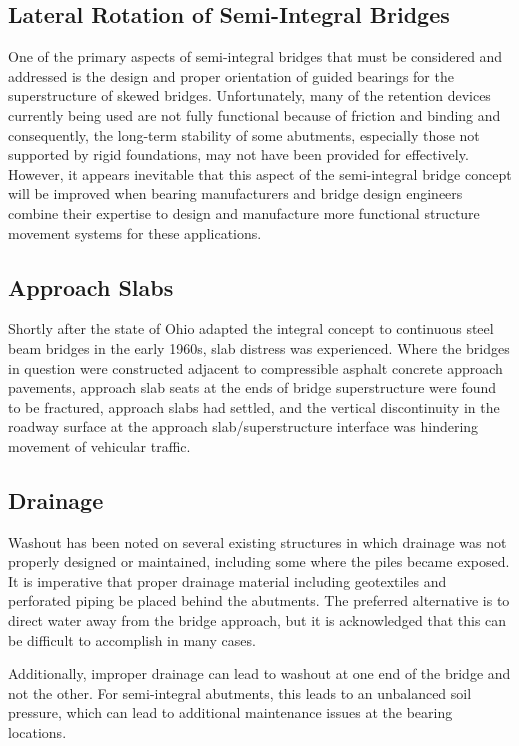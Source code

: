 \subsection{Lateral Rotation of Semi-Integral Bridges}
One of the primary aspects of semi-integral bridges that must be considered and addressed is the design and
proper orientation of guided bearings for the superstructure of skewed bridges. Unfortunately, many of the retention
devices currently being used are not fully functional because of friction and binding and consequently, the long-term
stability of some abutments, especially those not supported by rigid foundations, may not have been provided for
effectively. However, it appears inevitable that this aspect of the semi-integral bridge concept will be improved when
bearing manufacturers and bridge design engineers combine their expertise to design and manufacture more
functional structure movement systems for these applications.

\subsection{Approach Slabs}
Shortly after the state of Ohio adapted the integral concept to continuous steel beam bridges in the early 1960s,
slab distress was experienced. Where the bridges in question were constructed adjacent to compressible asphalt
concrete approach pavements, approach slab seats at the ends of bridge superstructure were found to be fractured,
approach slabs had settled, and the vertical discontinuity in the roadway surface at the approach slab/superstructure
interface was hindering movement of vehicular traffic.

\subsection{Drainage}
Washout has been noted on several existing structures in which drainage was not properly designed or
maintained, including some where the piles became exposed. It is imperative that proper drainage material including
geotextiles and perforated piping be placed behind the abutments. The preferred alternative is to direct water away
from the bridge approach, but it is acknowledged that this can be difficult to accomplish in many cases.

Additionally, improper drainage can lead to washout at one end of the bridge and not the other. For semi-integral
abutments, this leads to an unbalanced soil pressure, which can lead to additional maintenance issues at the bearing
locations.

